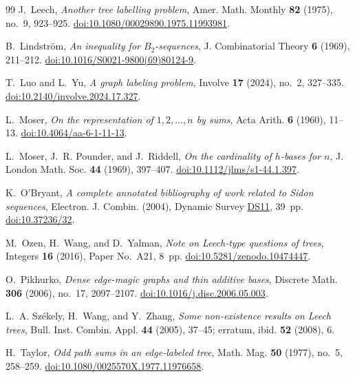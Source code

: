 \documentclass[11pt]{article}
\theoremstyle{definition}
\theoremstyle{remark}
\numberwithin{equation}{section}
\begin{document}
\begin{thebibliography}{99}
J.~Leech,
\emph{Another tree labelling problem},
Amer. Math. Monthly \textbf{82} (1975), no.~9, 923--925.
\href{https://doi.org/10.1080/00029890.1975.11993981}{doi:10.1080/00029890.1975.11993981}.

B.~Lindstr\"om,
\emph{An inequality for $B_2$-sequences},
J. Combinatorial Theory \textbf{6} (1969), 211--212.
\href{https://doi.org/10.1016/S0021-9800(69)80124-9}{doi:10.1016/S0021-9800(69)80124-9}.

T.~Luo and L.~Yu,
\emph{A graph labeling problem},
Involve \textbf{17} (2024), no.~2, 327--335.
\href{https://doi.org/10.2140/involve.2024.17.327}{doi:10.2140/involve.2024.17.327}.

L.~Moser,
\emph{On the representation of $1,2,\ldots,n$ by sums},
Acta Arith. \textbf{6} (1960), 11--13.
\href{https://doi.org/10.4064/aa-6-1-11-13}{doi:10.4064/aa-6-1-11-13}.

L.~Moser, J.~R. Pounder, and J.~Riddell,
\emph{On the cardinality of $h$-bases for $n$},
J. London Math. Soc. \textbf{44} (1969), 397--407.
\href{https://doi.org/10.1112/jlms/s1-44.1.397}{doi:10.1112/jlms/s1-44.1.397}.

K.~O'Bryant,
\emph{A complete annotated bibliography of work related to Sidon sequences},
Electron. J. Combin. (2004), Dynamic Survey
\href{https://www.combinatorics.org/ojs/index.php/eljc/article/view/DS11}{DS11}, 39~pp.
\href{https://doi.org/10.37236/32}{doi:10.37236/32}.

M.~Ozen, H.~Wang, and D.~Yalman,
\emph{Note on Leech-type questions of trees},
Integers \textbf{16} (2016), Paper No.~A21, 8~pp.
\href{https://doi.org/10.5281/zenodo.10474447}{doi:10.5281/zenodo.10474447}.

O.~Pikhurko,
\emph{Dense edge-magic graphs and thin additive bases},
Discrete Math. \textbf{306} (2006), no.~17, 2097--2107.
\href{https://doi.org/10.1016/j.disc.2006.05.003}{doi:10.1016/j.disc.2006.05.003}.

L.~A. Sz\'ekely, H.~Wang, and Y.~Zhang,
\emph{Some non-existence results on Leech trees},
Bull. Inst. Combin. Appl. \textbf{44} (2005), 37--45;
erratum, ibid. \textbf{52} (2008), 6.

H.~Taylor,
\emph{Odd path sums in an edge-labeled tree},
Math. Mag. \textbf{50} (1977), no.~5, 258--259.
\href{https://doi.org/10.1080/0025570X.1977.11976658}{doi:10.1080/0025570X.1977.11976658}.


\end{thebibliography}
\end{document}
